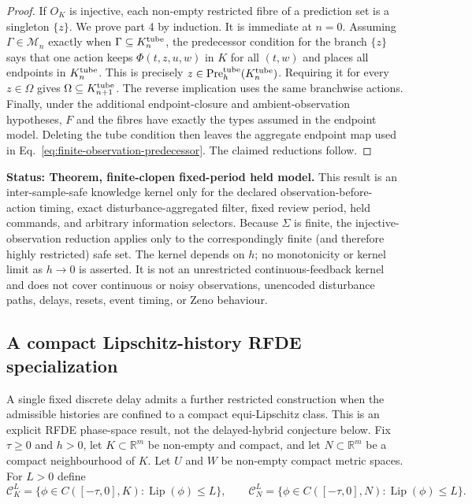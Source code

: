 \documentclass[11pt]{article}
\theoremstyle{definition}
\newcommand{\Pre}{\operatorname{Pre}}
\newcommand{\status}[1]{\par\smallskip\noindent\textbf{Status: #1.}\quad}
\begin{document}
\begin{proof}
If $O_K$ is injective, each non-empty restricted fibre of a prediction
set is a singleton $\{z\}$.  We prove part 4 by induction.  It is immediate
at $n=0$.  Assuming
$\Gamma\in\mathcal M_n$ exactly when
$\Gamma\subseteq K_n^{\rm tube}$, the predecessor condition for the branch
$\{z\}$ says that one action keeps
$\Phi(t,z,u,w)$ in $K$ for all $(t,w)$ and places all endpoints in
$K_n^{\rm tube}$.  This is precisely
$z\in\Pre_h^{\rm tube}(K_n^{\rm tube})$.  Requiring it for every
$z\in\Omega$ gives
$\Omega\subseteq K_{n+1}^{\rm tube}$.  The reverse implication uses the
same branchwise actions.  Finally, under the additional endpoint-closure and ambient-observation
hypotheses, $F$ and the fibres have exactly the types assumed in the endpoint
model.  Deleting the tube condition then leaves the aggregate endpoint map
used in
Eq.~\eqref{eq:finite-observation-predecessor}.  The claimed reductions
follow.
\end{proof}

\status{Theorem, finite-clopen fixed-period held model} This result is an
inter-sample-safe knowledge kernel only for the declared observation-before-
action timing, exact disturbance-aggregated filter, fixed review period,
held commands, and arbitrary information selectors.  Because $\Sigma$ is finite, the injective-observation reduction applies only to
the correspondingly finite (and therefore highly restricted) safe set.
The kernel depends on $h$; no monotonicity or kernel limit as $h\to0$ is
asserted.  It is not an unrestricted continuous-feedback kernel and does not cover continuous or
noisy observations, unencoded disturbance paths, delays, resets, event
timing, or Zeno behaviour.

\subsection{A compact Lipschitz-history RFDE specialization}

A single fixed discrete delay admits a further restricted construction when
the admissible histories are confined to a compact equi-Lipschitz class.
This is an explicit RFDE phase-space result, not the delayed-hybrid
conjecture below.  Fix $\tau\ge0$ and $h>0$, let $K\subset\mathbb R^m$ be non-empty and
compact, and let $N\subset\mathbb R^m$ be a compact neighbourhood of $K$.
Let $U$ and $W$ be non-empty compact metric spaces.  For $L>0$ define
\[
\mathscr C_K^L=\{\phi\in C([ -\tau,0],K):\operatorname{Lip}(\phi)\le L\},
\qquad
\mathscr C_N^L=\{\phi\in C([ -\tau,0],N):\operatorname{Lip}(\phi)\le L\}.
\]
\end{document}
